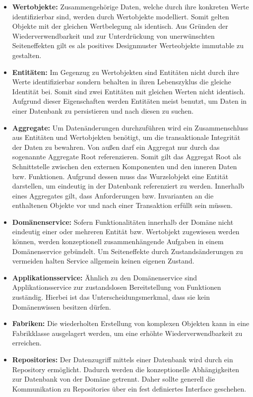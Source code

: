 \begin{itemize}[]
	\item \textbf{Wertobjekte: } {Zusammengehörige Daten, welche durch ihre konkreten Werte identifizierbar sind, werden durch Wertobjekte modelliert. Somit gelten Objekte mit der gleichen Wertbelegung als identisch. Aus Gründen der Wiederverwendbarkeit und zur Unterdrückung von unerwünschten Seiteneffekten gilt es als positives Designmuster Werteobjekte immutable zu gestalten.}
	\item \textbf{Entitäten: } {Im Gegenzug zu Wertobjekten sind Entitäten nicht durch ihre Werte identifizierbar sondern behalten in ihren Lebenszyklus die gleiche Identität bei. Somit sind zwei Entitäten mit gleichen Werten nicht identisch. Aufgrund dieser Eigenschaften werden Entitäten meist benutzt, um Daten in einer Datenbank zu persistieren und nach diesen zu suchen.}
	\item \textbf{Aggregate: } {Um Datenänderungen durchzuführen wird ein Zusammenschluss aus Entitäten und Wertobjekten benötigt, um die {\color{red} transaktionale Integrität} der Daten zu bewahren. Von außen darf ein Aggregat nur durch das sogenannte Aggregate Root referenzieren. Somit gilt das Aggregat Root als Schnittstelle zwischen den externen Komponenten und den inneren Daten bzw. Funktionen. Aufgrund dessen muss das Wurzelobjekt eine Entität darstellen, um eindeutig in der Datenbank referenziert zu werden. Innerhalb eines Aggregates gilt, dass Anforderungen bzw. Invarianten an die enthaltenen Objekte vor und nach einer Transaktion erfüllt sein müssen.}
	\item \textbf{Domänenservice: } {Sofern Funktionalitäten innerhalb der Domäne nicht eindeutig einer oder mehreren Entität bzw. Wertobjekt zugewiesen werden können, werden konzeptionell zusammenhängende Aufgaben in einem Domänenservice gebündelt. Um Seiteneffekte durch Zustandsänderungen zu vermeiden halten Service allgemein keinen eigenen Zustand.}
	\item \textbf{Applikationsservice: } {Ähnlich zu den Domänenservice sind Applikationsservice zur zustandslosen Bereitstellung von Funktionen zuständig. Hierbei ist das Unterscheidungsmerkmal, dass sie kein Domänenwissen besitzen dürfen.} %
	\item \textbf{Fabriken: } {Die wiederholten Erstellung von komplexen Objekten kann in eine Fabrikklasse ausgelagert werden, um eine erhöhte Wiederverwendbarkeit zu erreichen. }
	\item \textbf{Repositories: } {Der Datenzugriff mittels einer Datenbank wird durch ein Repository ermöglicht. Dadurch werden die konzeptionelle Abhängigkeiten zur Datenbank von der Domäne getrennt. Daher sollte generell die Kommunikation zu Repositories über ein fest definiertes Interface geschehen.}
\end{itemize}

